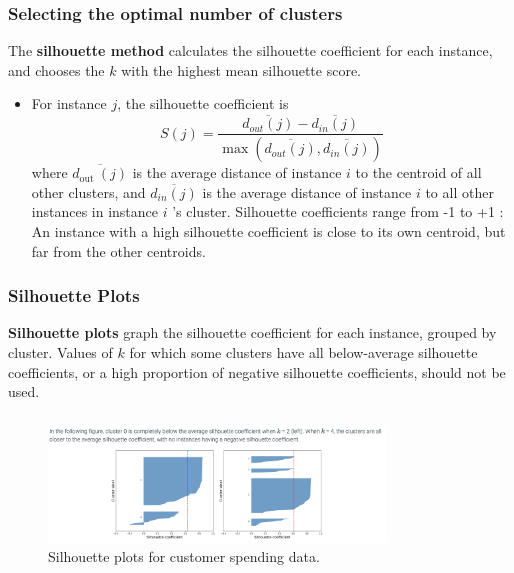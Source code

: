 \documentclass[10pt,dvipsnames]{beamer}
\begin{document}
\begin{frame}
    \frametitle{Selecting the optimal number of clusters}
    The \textbf{silhouette method} calculates the silhouette coefficient for each instance, and chooses the $k$ with the highest mean silhouette score.
    \begin{itemize}
        \item For instance $j$, the silhouette coefficient is
              $$
                  S(j)=\frac{\overline{d_{o u t}(j)}-\overline{d_{i n}(j)}}{\max \left(\overline{d_{o u t}(j)}, \overline{d_{i n}(j)}\right)}
              $$
              where $\overline{d_{\text {out }}(j)}$ is the average distance of instance $i$ to the centroid of all other clusters, and $\overline{d_{i n}(j)}$ is the average distance of instance $i$ to all other instances in instance $i$ 's cluster. Silhouette coefficients range from -1 to +1 : An instance with a high silhouette coefficient is close to its own centroid, but far from the other centroids.
    \end{itemize}
\end{frame}

\begin{frame}
    \frametitle{Silhouette Plots}
    \textbf{Silhouette plots} graph the silhouette coefficient for each instance, grouped by cluster. Values of $k$ for which some clusters have all below-average silhouette coefficients, or a high proportion of negative silhouette coefficients, should not be used.
\end{frame}

\begin{frame}
    \frametitle{}
    \begin{figure}[ht]
        \centering
        \includegraphics[width=0.8\textwidth]{imgs/k_mean_9.png}
        \caption{Silhouette plots for customer spending data.}
    \end{figure}
\end{frame}
\end{document}
